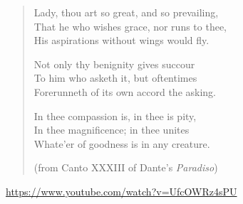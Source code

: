 \begin{verse}
Lady, thou art so great, and so prevailing,\\
That he who wishes grace, nor runs to thee,\\
His aspirations without wings would ﬂy.

Not only thy benignity gives succour\\
To him who asketh it, but oftentimes\\
Forerunneth of its own accord the asking.

In thee compassion is, in thee is pity,\\
In thee magniﬁcence; in thee unites\\
Whate'er of goodness is in any creature.

(from Canto XXXIII of Dante's \textit{Paradiso})
\end{verse}

\url{https://www.youtube.com/watch?v=UfcOWRz4sPU}



